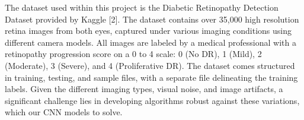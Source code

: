 The dataset used within this project is the Diabetic Retinopathy Detection Dataset provided by Kaggle [2]. The dataset contains over 35,000 high resolution retina images from both eyes, captured under various imaging conditions using different camera models. All images are labeled by a medical professional with a retinopathy progression score on a 0 to 4 scale: 0 (No DR), 1 (Mild), 2 (Moderate), 3 (Severe), and 4 (Proliferative DR). The dataset comes structured in training, testing, and sample files, with a separate file delineating the training labels. Given the different imaging types, visual noise, and image artifacts, a significant challenge lies in developing algorithms robust against these variations, which our CNN models to solve.